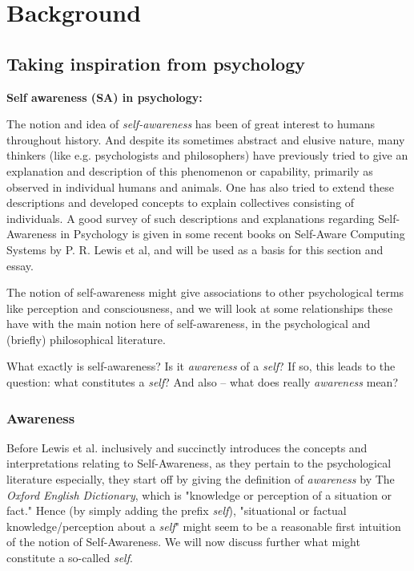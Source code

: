 \chapter{Background}
\label{chap:background}


\section{Taking inspiration from psychology}

\textbf{Self awareness (SA) in psychology:} \nl	

The notion and idea of \textit{self-awareness} has been of great interest to humans throughout history. And despite its sometimes abstract and elusive nature, many thinkers (like e.g. psychologists and philosophers) have previously tried to give an explanation and description of this phenomenon or capability, primarily as observed in individual humans and animals. One has also tried to extend these descriptions and developed concepts to explain collectives consisting of individuals. A good survey of such descriptions and explanations regarding Self-Awareness in Psychology is given in some recent books on Self-Aware Computing Systems \cite{sacs16_ch2, sacs17_ch3} by P. R. Lewis et al, and will be used as a basis for this section and essay.

The notion of self-awareness might give associations to other psychological terms like perception and consciousness, and we will look at some relationships these have with the main notion here of self-awareness, in the psychological and (briefly) philosophical literature.
\newline

What exactly is self-awareness? Is it \textit{awareness} of a \textit{self}? If so, this leads to the question: what constitutes a \textit{self}? And also -- what does really \textit{awareness} mean?
\newline

	\subsection{Awareness}

	Before Lewis et al. \cite{sacs16_ch2} inclusively and succinctly introduces the concepts and interpretations relating to Self-Awareness, as they pertain to the psychological literature especially, they start off by giving the definition of \textit{awareness} by The \textit{Oxford English Dictionary}, which is "knowledge or perception of a situation or fact." Hence (by simply adding the prefix \textit{self}), "situational or factual knowledge/perception about a \textit{self}" might seem to be a reasonable first intuition of the notion of Self-Awareness. We will now discuss further what might constitute a so-called \textit{self}.


